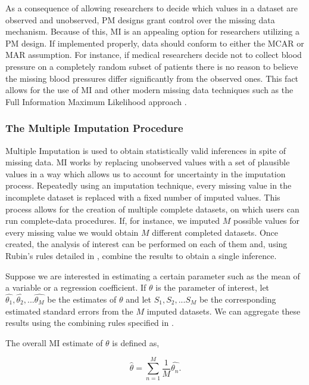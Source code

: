\documentclass{svjour3}\usepackage[]{graphicx}\usepackage[]{color}
\begin{document}
As a consequence of allowing researchers to decide which values in a dataset are observed and unobserved, PM designs grant control over the missing data mechanism. Because of this, MI is an appealing option for researchers utilizing a PM design. If implemented properly, data should conform to either the MCAR or MAR assumption. For instance, if medical researchers decide not to collect blood pressure on a completely random subset of patients there is no reason to believe the missing blood pressures differ significantly from the observed ones. This fact allows for the use of MI and other modern missing data techniques such as the Full Information Maximum Likelihood approach \citep{dempster1977maximum}. \par

\subsubsection{The Multiple Imputation Procedure}
\label{sec:1.3.2}
Multiple Imputation is used to obtain statistically valid inferences in spite of missing data. MI works by replacing unobserved values with a set of plausible values in a way which allows us to account for uncertainty in the imputation process. Repeatedly using an imputation technique, every missing value in the incomplete dataset is replaced with a fixed number of imputed values. This process allows for the creation of multiple complete datasets, on which users can run complete-data procedures. If, for instance, we imputed $M$ possible values for every missing value we would obtain $M$ different completed datasets. Once created, the analysis of interest can be performed on each of them and, using Rubin's rules detailed in \citet{rubin2004multiple}, combine the results to obtain a single inference. \par

Suppose we are interested in estimating a certain parameter such as the mean of a variable or a regression coefficient. If $\theta$ is the parameter of interest, let $\widehat{\theta_1}, \widehat{\theta_2}, ... \widehat{\theta_M}$ be the estimates of $\theta$ and let $S_1, S_2, ... S_M$ be the corresponding estimated standard errors from the $M$ imputed datasets. We can aggregate these results using the combining rules specified in \citet{rubin2004multiple}. \par
The overall MI estimate of $\theta$ is defined as,

\begin{equation}
\widehat{\theta} = \sum_{n=1}^{M} \frac{1}{M} \widehat{\theta_n}.
\end{equation}
\end{document}
